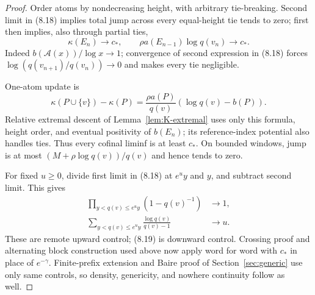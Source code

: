 \documentclass[11pt]{article}
\theoremstyle{definition}
\theoremstyle{remark}
\begin{document}
\begin{proof}
Order atoms by nondecreasing height, with arbitrary tie-breaking.  Second limit in (8.18) implies
total jump across every equal-height tie tends to zero; first then implies, also through partial
ties,
\begin{equation}
 \kappa(E_n)\to c_*,\qquad
 \rho a(E_{n-1})\log q(v_n)\to c_*.                      \tag{8.19}
\end{equation}
Indeed $b(\mathcal A(x))/\log x\to1$; convergence of second expression in (8.18) forces
$\log(q(v_{n+1})/q(v_n))\to0$ and makes every tie negligible.

One-atom update is
\[
 \kappa(P\cup\{v\})-\kappa(P)
 =\frac{\rho a(P)}{q(v)}(\log q(v)-b(P)).
\]
Relative extremal descent of Lemma~\ref{lem:K-extremal} uses only this formula, height order, and
eventual positivity of $b(E_n)$; its reference-index potential also handles ties.  Thus every
cofinal liminf is at least $c_*$.  On bounded windows, jump is at most
$(M+\rho\log q(v))/q(v)$ and hence tends to zero.

For fixed $u\geq0$, divide first limit in (8.18) at $e^uy$ and $y$, and subtract second limit.
This gives
\begin{align*}
 \prod_{y<q(v)\leq e^uy}(1-q(v)^{-1})&\to1,\\
 \sum_{y<q(v)\leq e^uy}\frac{\log q(v)}{q(v)-1}&\to u.
\end{align*}
These are remote upward control; (8.19) is downward control.  Crossing proof and alternating
block construction used above now apply word for word with $c_*$ in place of $e^{-\gamma}$.
Finite-prefix extension and Baire proof of Section~\ref{sec:generic} use only same controls, so
density, genericity, and nowhere continuity follow as well.
\end{proof}
\end{document}
